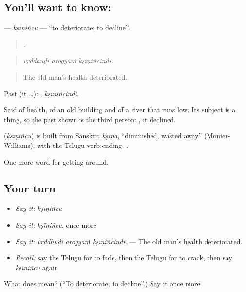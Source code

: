 \subsection*{You'll want to know: }
\textbf{} — \emph{kṣīṇiñcu} — \textquotedblleft{}to deteriorate; to decline\textquotedblright{}.

\begin{quote}
  .
\end{quote}

\begin{quote}
\emph{vṛddhuḍi ārōgyaṁ kṣīṇiñcindi.}
\end{quote}

\begin{quote}
The old man's health deteriorated.
\end{quote}

Past (it …): , \emph{kṣīṇiñcindi}.

Said of health, of an old building and of a river that runs low. Its subject is a thing, so the past shown is the third person: , it declined.

\begin{cousinweb}
\textbf{} (\emph{kṣīṇiñcu}) is built from Sanskrit \emph{kṣīṇa}, \textquotedblleft{}diminished, wasted away\textquotedblright{} (Monier-Williams), with the Telugu verb ending -.
\end{cousinweb}

\begin{grammarlens}[title={What you've built}]
One more word for getting around.
\end{grammarlens}

\subsection*{Your turn}
\begin{itemize}
\raggedright
  \item \emph{Say it:} \emph{kṣīṇiñcu}
  \item \emph{Say it:} \emph{kṣīṇiñcu}, once more
  \item \emph{Say it:} \emph{vṛddhuḍi ārōgyaṁ kṣīṇiñcindi.} — The old man's health deteriorated.
  \item \emph{Recall:} say the Telugu for to fade, then the Telugu for to crack, then say \emph{kṣīṇiñcu} again
\end{itemize}

\begin{tcolorbox}[breakable,colback=teal!4,colframe=teal!35!black,title={Before you move on}]
What does  mean? (\textquotedblleft{}To deteriorate; to decline\textquotedblright{}.) Say it once more.
\end{tcolorbox}
